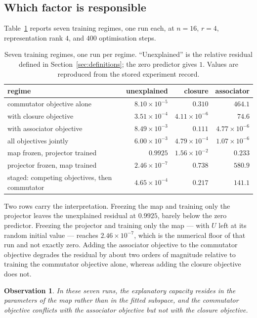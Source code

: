 \documentclass[11pt]{amsart}
\newtheorem{observation}{Observation}[section]
\theoremstyle{remark}
\begin{document}
\subsection{Which factor is responsible}

Table~\ref{tab:ablation} reports seven training regimes, one run each, at $n=16$, $r=4$,
representation rank $4$, and $400$ optimisation steps.

\begin{table}[h]
\centering\small
\caption{Seven training regimes, one run per regime. ``Unexplained'' is the relative
residual defined in Section~\ref{sec:definitions}; the zero predictor gives $1$. Values are
reproduced from the stored experiment record.}
\label{tab:ablation}
\begin{tabular}{@{}lrrr@{}}
\toprule
regime & unexplained & closure & associator \\
\midrule
commutator objective alone & $8.10\times10^{-5}$ & $0.310$ & $464.1$ \\
\quad with closure objective & $3.51\times10^{-4}$ & $4.11\times10^{-6}$ & $74.6$ \\
\quad with associator objective & $8.49\times10^{-3}$ & $0.111$ & $4.77\times10^{-6}$ \\
all objectives jointly & $6.00\times10^{-3}$ & $4.79\times10^{-4}$ & $1.07\times10^{-6}$ \\
map frozen, projector trained & $0.9925$ & $1.56\times10^{-2}$ & $0.233$ \\
projector frozen, map trained & $2.46\times10^{-7}$ & $0.738$ & $580.9$ \\
staged: competing objectives, then commutator & $4.65\times10^{-4}$ & $0.217$ & $141.1$ \\
\bottomrule
\end{tabular}
\end{table}

Two rows carry the interpretation. Freezing the map and training only the projector leaves
the unexplained residual at $0.9925$, barely below the zero predictor. Freezing the
projector and training only the map --- with $U$ left at its random initial value ---
reaches $2.46\times10^{-7}$, which is the numerical floor of that run and not exactly zero.
Adding the associator objective to the commutator objective degrades the residual by about
two orders of magnitude relative to training the commutator objective alone, whereas adding
the closure objective does not.

\begin{observation}
\label{obs:mechanism}
In these seven runs, the explanatory capacity resides in the parameters of the map rather
than in the fitted subspace, and the commutator objective conflicts with the associator
objective but not with the closure objective.
\end{observation}
\end{document}
